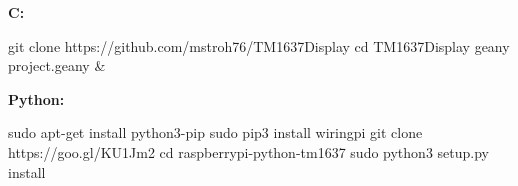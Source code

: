 
\textbf{C:} 

\begin{console}
git clone https://github.com/mstroh76/TM1637Display
cd TM1637Display
geany project.geany & 
\end{console}

\textbf{Python:}
\begin{console}
sudo apt-get install python3-pip
sudo pip3 install wiringpi
git clone https://goo.gl/KU1Jm2
cd raspberrypi-python-tm1637
sudo python3 setup.py install
\end{console}

\lstset{language=Python, caption=, 
        label=TM1637Program, frame=single, basicstyle=\ttfamily
	      \footnotesize, breakatwhitespace=false, showstringspaces=false, 
        showtabs=false, tabsize=2 }

